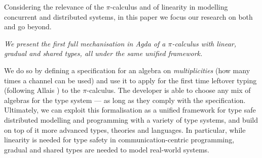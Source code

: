 \documentclass[a4paper,UKenglish,cleveref,autoref,thm-restate,authorcolumns]{lipics-v2019}
\theoremstyle{definition}
\newcommand{\picalc}{$\pi$-calculus}
\begin{document}
Considering the relevance of the \picalc{} and of linearity in modelling concurrent and distributed systems, in this paper we focus our research on both and go beyond.

\emph{We present the first full mechanisation in Agda of a \picalc{} with linear, gradual and shared types, all under the same unified framework.}

We do so by defining a specification for an algebra on \emph{multiplicities} (how many times a channel can be used) and use it to apply for the first time leftover typing (following Allais \cite{Allais2018a}) to the \picalc{}.
The developer is able to choose any mix of algebras for the type system --- as long as they comply with the specification.
Ultimately, we can exploit this formalisation as a unified framework for type safe distributed modelling and programming with a variety of type systems, and build on top of it more advanced types, theories and languages.
In particular, while linearity is needed for type safety in communication-centric programming, gradual and shared types are needed to model real-world systems.
\end{document}
